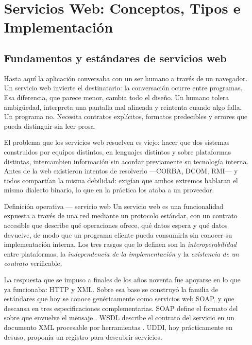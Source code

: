 \documentclass[11pt,a4paper,openany]{book}
\begin{document}
\section{Servicios Web: Conceptos, Tipos e Implementación}
\label{sec:u4:servicios}

\subsection{Fundamentos y estándares de servicios web}
\label{sec:u4:fundamentos}

Hasta aquí la aplicación conversaba con un ser humano a través de un navegador. Un servicio web invierte el destinatario: la conversación ocurre entre programas. Esa diferencia, que parece menor, cambia todo el diseño. Un humano tolera ambigüedad, interpreta una pantalla mal alineada y reintenta cuando algo falla. Un programa no. Necesita contratos explícitos, formatos predecibles y errores que pueda distinguir sin leer prosa.

El problema que los servicios web resuelven es viejo: hacer que dos sistemas construidos por equipos distintos, en lenguajes distintos y sobre plataformas distintas, intercambien información sin acordar previamente su tecnología interna. Antes de la web existieron intentos de resolverlo ---CORBA, DCOM, RMI--- y todos compartían la misma debilidad: exigían que ambos extremos hablaran el mismo dialecto binario, lo que en la práctica los ataba a un proveedor.

\begin{cajadefinicion}{Definición operativa --- servicio web}
	Un servicio web es una funcionalidad expuesta a través de una red mediante un protocolo estándar, con un contrato accesible que describe qué operaciones ofrece, qué datos espera y qué datos devuelve, de modo que un programa cliente pueda consumirla sin conocer su implementación interna. Los tres rasgos que lo definen son la \emph{interoperabilidad} entre plataformas, la \emph{independencia de la implementación} y la \emph{existencia de un contrato} verificable.
\end{cajadefinicion}

La respuesta que se impuso a finales de los años noventa fue apoyarse en lo que ya funcionaba: HTTP y XML. Sobre esa base se construyó la familia de estándares que hoy se conoce genéricamente como servicios web SOAP, y que descansa en tres especificaciones complementarias. SOAP define el formato del sobre que envuelve el mensaje \cite{w3c2007soap12}. WSDL describe el contrato del servicio en un documento XML procesable por herramientas \cite{w3c2007wsdl20}. UDDI, hoy prácticamente en desuso, proponía un registro para descubrir servicios.
\end{document}
